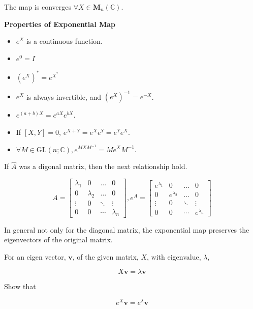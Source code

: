 The map is converges $\forall X \in \mathbf{M}_{n}(\mathbb{C})$.

\begin{theorem} \textbf{Properties of Exponential Map}
    \begin{itemize}
        \item $e^X$ is a continuous function.
        \item $e^0 = I$
        \item $(e^X)^\ast = e^{X^\ast}$
        \item $e^X$ is always invertible, and $(e^X)^{-1} = e^{-X}$.
        \item $e^{(a+b)X} = e^{aX} e^{bX}$.
        \item If $[X, Y] = 0$, $e^{X+Y} = e^{X}e^{Y} = e^{Y}e^{X}$.
        \item $\forall M \in \text{GL}(n; \mathbb{C}), e^{M X M^{-1}} = M e^{X} M^{-1}$. 
    \end{itemize}
\end{theorem}

If $\hat{A}$ was a digonal matrix, then the next relationship hold.

\begin{equation*}
    A = \begin{bmatrix}
        \lambda_1 & 0 & \dots & 0 \\
        0 & \lambda_2 & \dots & 0 \\
        \vdots & 0 & \ddots & \vdots\\
        0 & 0 & \cdots & \lambda_n
    \end{bmatrix},
    e^A = \begin{bmatrix}
        e^{\lambda_1} & 0 & \dots & 0 \\
        0 & e^{\lambda_2} & \dots & 0 \\
        \vdots & 0 & \ddots & \vdots\\
        0 & 0 & \cdots & e^{\lambda_n}
    \end{bmatrix}
\end{equation*}

In general not only for the diagonal matrix, 
the exponential map preserves the eigenvectors of the original matrix.

\begin{exercise}
    For an eigen vector, $\mathbf{v}$, of the given matrix, $X$, with eigenvalue, $\lambda$,

    \begin{equation}
        X \mathbf{v} = \lambda \mathbf{v}
    \end{equation}

    Show that 

    \begin{equation*}
        e^X \mathbf{v} = e^\lambda \mathbf{v}
    \end{equation*}
\end{exercise}

